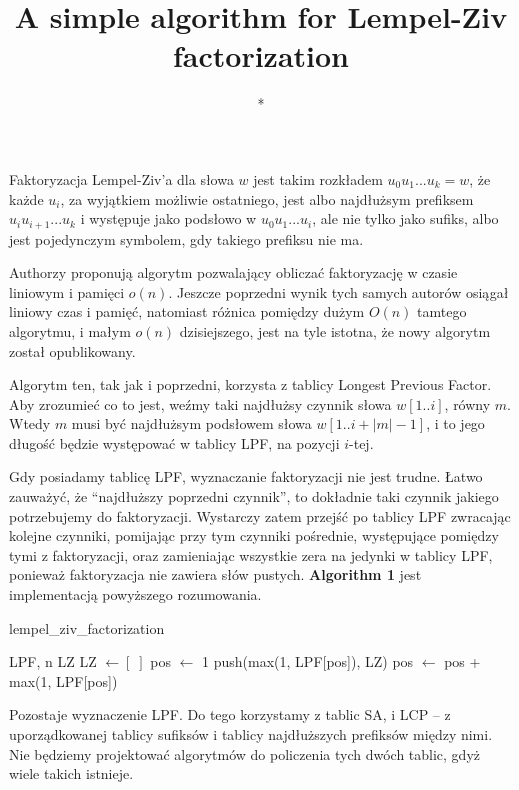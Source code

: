 \documentclass[a4paper,12pt]{article}
\title{A simple algorithm for Lempel-Ziv factorization}
\author{*}
\theoremstyle{definition}
\begin{document}
\maketitle

Faktoryzacja Lempel-Ziv'a dla słowa $w$ jest takim rozkładem $u_0 u_1 ... u_k = w$,
że każde $u_i$, za wyjątkiem możliwie ostatniego,
jest albo najdłużsym prefiksem $u_i u_{i + 1} ... u_k$ i występuje jako podsłowo w $u_0 u_1 ... u_i$,
ale nie tylko jako sufiks,
albo jest pojedynczym symbolem, gdy takiego prefiksu nie ma.

Authorzy proponują algorytm pozwalający obliczać faktoryzację w czasie liniowym i pamięci $o(n)$.
Jeszcze poprzedni wynik tych samych autorów osiągał liniowy czas i pamięć,
natomiast różnica pomiędzy dużym $O(n)$ tamtego algorytmu, i małym $o(n)$ dzisiejszego, jest na tyle istotna,
że nowy algorytm został opublikowany.

Algorytm ten, tak jak i poprzedni, korzysta z tablicy Longest Previous Factor.
Aby zrozumieć co to jest, weźmy taki najdłużsy czynnik słowa $w[1..i]$, równy $m$.
Wtedy $m$ musi być najdłużsym podsłowem słowa $w[1..i + |m| - 1]$,
i to jego długość będzie występować w tablicy LPF, na pozycji $i$-tej.

Gdy posiadamy tablicę LPF, wyznaczanie faktoryzacji nie jest trudne.
Łatwo zauważyć, że ``najdłuższy poprzedni czynnik'', to dokładnie taki czynnik jakiego potrzebujemy do faktoryzacji.
Wystarczy zatem przejść po tablicy LPF zwracając kolejne czynniki,
pomijając przy tym czynniki pośrednie, występujące pomiędzy tymi z faktoryzacji,
oraz zamieniając wszystkie zera na jedynki w tablicy LPF, ponieważ faktoryzacja nie zawiera słów pustych.
\textbf{Algorithm 1} jest implementacją powyższego rozumowania.

\begin{algorithm}
\caption{lempel\_ziv\_factorization}
\begin{algorithmic} 
\REQUIRE LPF, n
\ENSURE LZ
\STATE LZ $\gets [\;]$
\STATE pos $\gets$ 1
\STATE push(max(1, LPF[pos]), LZ)
\STATE pos $\gets$ pos + max(1, LPF[pos])
\ENDWHILE
\end{algorithmic}
\end{algorithm}

Pozostaje wyznaczenie LPF. Do tego korzystamy z tablic SA, i LCP --
z uporządkowanej tablicy sufiksów i tablicy najdłuższych prefiksów między nimi.
Nie będziemy projektować algorytmów do policzenia tych dwóch tablic,
gdyż wiele takich istnieje.
\end{document}
